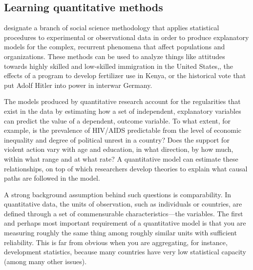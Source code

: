 	
	
	\subsection{Learning quantitative methods}%
		\label{sec:quantitative-methods}

	 designate a branch of social science methodology that applies statistical procedures to experimental or observational data in order to produce explanatory models for the complex, recurrent phenomena that affect populations and organizations. These methods can be used to analyze things like attitudes towards highly skilled and low-skilled immigration in the United States,\cite{HainmuellerHiscox:2010a}, the effects of a program to develop fertilizer use in Kenya,\cite{DufloKremer:2009a} or the historical vote that put Adolf Hitler into power in interwar Germany\cite{KingRosen:2008a}.%

	The models produced by quantitative research account for the regularities that exist in the data by estimating how a set of independent, explanatory variables can predict the value of a dependent, outcome variable. To what extent, for example, is the prevalence of HIV/AIDS predictable from the level of economic inequality and degree of political unrest in a country? Does the support for violent action vary with age and education, in what direction, by how much, within what range and at what rate? A quantitative model can estimate these relationships, on top of which researchers develop theories to explain what causal paths are followed in the model.%

	A strong background assumption behind such questions is comparability. In quantitative data, the units of observation, such as individuals or countries, are defined through a set of commensurable characteristics—the variables. The first and perhaps most important requirement of a quantitative model is that you are measuring roughly the same thing among roughly similar units with sufficient reliability. This is far from obvious when you are aggregating, for instance, development statistics, because many countries have very low statistical capacity (among many other issues).\cite{Jerven:2013a}%

